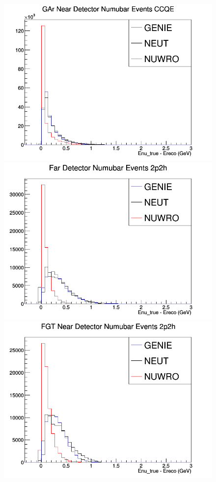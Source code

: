 \documentclass[12pt]{article}
\begin{document}
\begin{figure}[h]
\endminipage
{}
\includegraphics[width=\linewidth]{Ereco_Etrue/numubar_GAr_CCQE.png}
\endminipage
\newline
{}
\includegraphics[width=\linewidth]{Ereco_Etrue/numubar_FD_2p2h.png}
\endminipage
{}
\includegraphics[width=\linewidth]{Ereco_Etrue/numubar_FGT_2p2h.png}

\end{figure}
\end{document}

